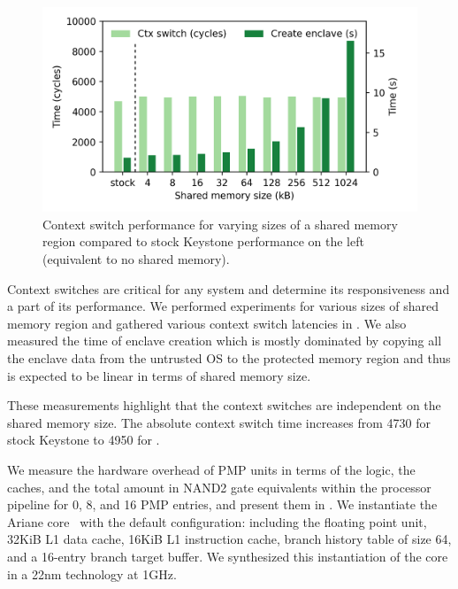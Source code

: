 \begin{figure}[t]
    \centering
    \includegraphics[width=\linewidth]{chapters/PIE/images/graphs/ctxswitch.png}
    \vspace{-3em}
    \caption{Context switch performance for varying sizes of a shared memory region compared to stock Keystone performance on the left (equivalent to no shared memory).}
    \label{fig:ctxswitches}
\end{figure}

Context switches are critical for any system and determine its responsiveness and a part of its performance.
We performed experiments for various sizes of shared memory region and gathered various context switch latencies in . We also measured the time of enclave creation which is mostly dominated by copying all the enclave data from the untrusted OS to the protected memory region and thus is expected to be linear in terms of shared memory size. 

These measurements highlight that the context switches are independent on the shared memory size. The absolute context switch time increases from 4730 for stock Keystone to 4950 for \name{}.

We measure the hardware overhead of PMP units in terms of the logic, the caches, and the total amount in NAND2 gate equivalents within the processor pipeline for 0, 8, and 16 PMP entries, and present them in . We instantiate the Ariane core~\cite{ariane} with the default configuration: including the floating point unit, 32KiB L1 data cache, 16KiB L1 instruction cache, branch history table of size 64, and a 16-entry branch target buffer. We synthesized this instantiation of the core in a 22nm technology at 1GHz. %


